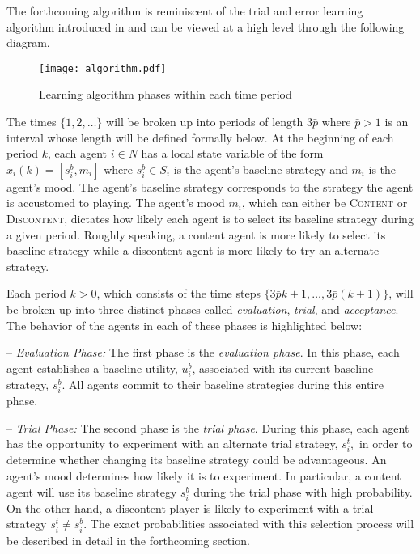 The forthcoming algorithm is reminiscent of the trial and error learning algorithm introduced in \cite{Young2009} and can be viewed at a high level through the following diagram.
%
\begin{figure}[H]
\begin{center}
\texttt{[image: algorithm.pdf]}
\caption{Learning algorithm phases within each time period}
\end{center}
\end{figure}
%
The times $\{1, 2, \dots\}$ will be broken up into periods of length $3 \bar{p}$ where $\bar{p} > 1$ is an interval whose length will be defined formally below.  At the beginning of each period $k$, each agent $i \in N$ has a local state variable of the form $x_i(k) = [s_i^b, m_i]$ where $s_i^b \in S_i$ is the agent's baseline strategy and $m_i$ is the agent's mood.  The agent's baseline strategy corresponds to the strategy the agent is accustomed to playing.  The agent's mood $m_i$, which can either be \textsc{Content} or \textsc{Discontent}, dictates how likely each agent is to select its baseline strategy during a given period.  Roughly speaking, a content agent is more likely to select its baseline strategy while a discontent agent is more likely to try an alternate strategy.  

Each period $k > 0$, which consists of the time steps $\{3 \bar{p} k + 1, \dots, 3 \bar{p} (k + 1)\}$, will be broken up into three distinct phases called {\it evaluation}, {\it trial}, and {\it acceptance}.  The behavior of the agents in each of these phases is highlighted below:
%

\vspace{.1cm}
%
\noindent -- {\it Evaluation Phase:} The first phase is the {\it evaluation phase}. In this phase, each agent  establishes a baseline utility, $u_i^b$, associated with its current baseline strategy, $s_i^b.$ All agents commit to their baseline strategies during this entire phase.

\vspace{.1cm}
%
\noindent -- {\it Trial Phase:} The second phase is the {\it trial phase}. During this phase, each agent has the opportunity to experiment with an alternate trial strategy, $s_i^t,$ in order to determine whether changing its baseline strategy could be advantageous. An agent's mood determines how likely it is to experiment.  In particular, a content agent will use its baseline strategy $s_i^b$ during the trial phase with high probability.  On the other hand, a discontent player is likely to experiment with a trial strategy $s_i^t \neq s_i^b$.  The exact probabilities associated with this selection process will be described in detail in the forthcoming section.   


